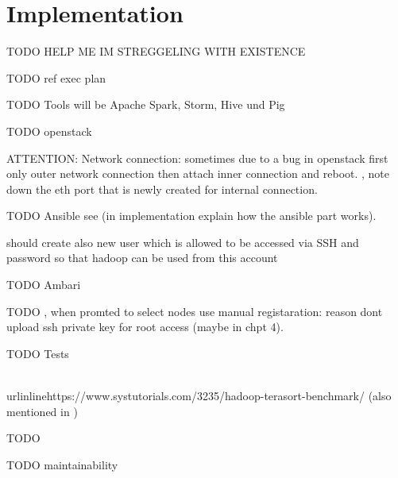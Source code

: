 \chapter{Implementation}
\label{chap:impl}

TODO HELP ME IM STREGGELING WITH EXISTENCE



TODO ref exec plan

TODO Tools will be Apache Spark, Storm, Hive und Pig

TODO openstack

    ATTENTION: Network connection: sometimes due to a bug in openstack first only outer network connection then attach inner connection and reboot. 
    , note down the eth port that is newly created for internal connection.

TODO Ansible
see 
     (in implementation explain how the ansible part works). 
     
     should create also new user which is allowed to be accessed via SSH and  password so that hadoop can be used from this account

TODO Ambari

    TODO ,  when promted to select nodes use manual registaration: reason dont upload ssh private key for root access (maybe in chpt 4).

TODO Tests



\\urlinline{https://www.systutorials.com/3235/hadoop-terasort-benchmark/} (also mentioned in \autocite[][]{white2015hadoop})


TODO

TODO maintainability
